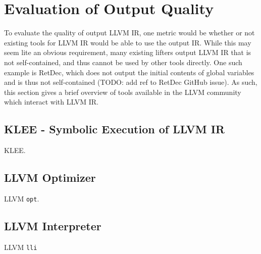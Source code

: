 

\section{Evaluation of Output Quality}

To evaluate the quality of output LLVM IR, one metric would be whether or not existing tools for LLVM IR would be able to use the output IR. While this may seem lite an obvious requirement, many existing lifters output LLVM IR that is not self-contained, and thus cannot be used by other tools directly. One such example is RetDec, which does not output the initial contents of global variables and is thus not self-contained (TODO: add ref to RetDec GitHub issue). As such, this section gives a brief overview of tools available in the LLVM community which interact with LLVM IR.


\subsection{KLEE - Symbolic Execution of LLVM IR}

KLEE.


\subsection{LLVM Optimizer}

LLVM \texttt{opt}.


\subsection{LLVM Interpreter}

LLVM \texttt{lli}
